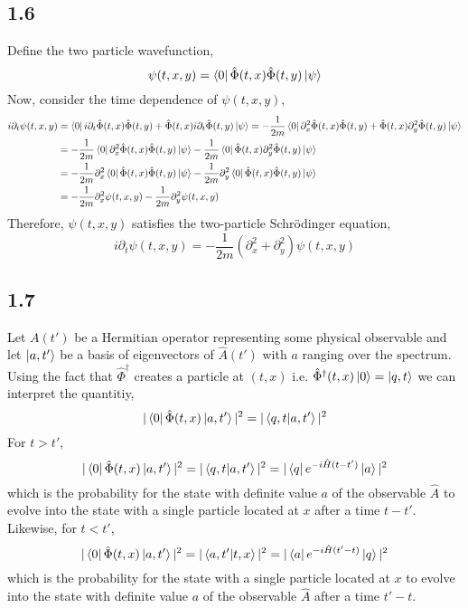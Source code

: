 \documentclass[12pt]{extarticle}
\newcommand{\field}{\hat{\Phi}}
\newcommand{\dfield}{\hat{\Phi}^\dagger}
\begin{document}
\subsection*{1.6}
Define the two particle wavefunction,
\[ \psi(t, x, y) = \bra{0} \field(t, x) \field(t, y) \ket{\psi}\]
Now, consider the time dependence of $\psi(t, x, y)$,
\begin{align*}
i \partial_t \psi(t, x, y) & = \bra{0} i \partial_t \field(t, x) \field(t, y) + \field(t, x) i \partial_t \field(t, y) \ket{\psi} = - \frac{1}{2m} \bra{0} \partial_x^2 \field(t, x) \field(t, y) + \field(t, x) \partial_y^2 \field(t, y) \ket{\psi}
\\
& = - \frac{1}{2m} \bra{0} \partial_x^2 \field(t, x) \field(t, y) \ket{\psi} - \frac{1}{2m} \bra{0} \field(t, x) \partial_y^2 \field(t, y) \ket{\psi} 
\\
& = - \frac{1}{2m} \partial_x^2 \bra{0} \field(t, x) \field(t, y) \ket{\psi} - \frac{1}{2m} \partial_y^2 \bra{0} \field(t, x) \field(t, y) \ket{\psi}
\\
& = - \frac{1}{2m} \partial_x^2 \psi(t, x, y) - \frac{1}{2m} \partial_y^2 \psi(t, x, y)
\end{align*}
Therefore, $\psi(t, x, y)$ satisfies the two-particle Schrödinger equation,
\[ i \partial_t \psi(t, x, y) = - \frac{1}{2m} \left( \partial_x^2 + \partial_y^2 \right) \psi(t, x, y)\]
\subsection*{1.7}

Let $A(t')$ be a Hermitian operator representing some physical observable and let $\left| a, t' \right>$ be a basis of eigenvectors of $\hat{A}(t')$ with $a$ ranging over the spectrum. Using the fact that $\dfield$ creates a particle at $(t, x)$ i.e. $\dfield(t, x) \ket{0} = \ket{q, t}$ we can interpret the quantitiy, 
\[ |\bra{0} \field(t, x) \ket{a, t'} |^2 = | \inner{q, t}{a, t'} |^2 \]
For $t > t'$,
\[ |\bra{0} \field(t, x) \ket{a, t'} |^2 = | \inner{q, t}{a, t'} |^2 = | \bra{q} e^{- i \hamilt (t - t')} \ket{a} |^2 \]
which is the probability for the state with definite value $a$ of the observable $\hat{A}$ to evolve into the state with a single particle located at $x$ after a time $t - t'$. \bigskip\\
Likewise, for $t < t'$,
\[ |\bra{0} \field(t, x) \ket{a, t'} |^2 = | \inner{a, t'}{t, x} |^2 = | \bra{a} e^{- i \hamilt (t' - t)} \ket{q} |^2 \]
which is the probability for the state with a single particle located at $x$ to evolve into the state with definite value $a$ of the observable $\hat{A}$ after a time $t' - t$. \bigskip\\
\end{document}
